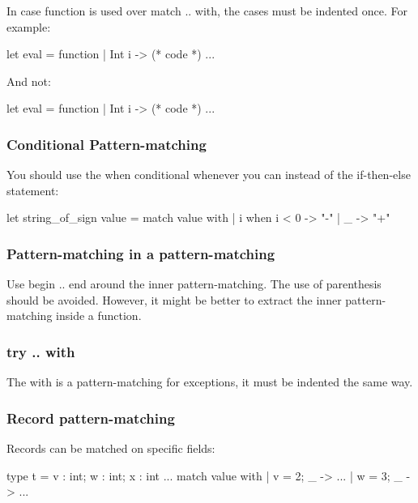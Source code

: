 \documentclass[12pt,a4paper]{article}
\begin{document}
\noindent
In case \textsf{function} is used over \textsf{match .. with}, the cases must be
indented once. For example:

\begin{OCaml}
let eval = function
  | Int i -> (* code *)
...
\end{OCaml}

\noindent
And not:

\begin{OCaml}
let eval = function
           | Int i -> (* code *)
...
\end{OCaml}

\subsubsection*{Conditional Pattern-matching}

You should use the when conditional whenever you can instead of the if-then-else statement:

\begin{OCaml}
let string_of_sign value =
  match value with
  | i when i < 0 -> "-"
  | _ -> "+"
\end{OCaml}

\subsubsection*{Pattern-matching in a pattern-matching}

\medskip

Use \textsf{begin .. end} around the inner pattern-matching. The use of parenthesis should be avoided. However, it might be better to extract the inner pattern-matching inside a function.

\subsubsection*{\textsf{try .. with}}

The with is a pattern-matching for exceptions, it must be indented the same way.

\subsubsection*{Record pattern-matching}

Records can be matched on specific fields:
\begin{OCaml}
type t = { v : int; w : int; x : int }
...
match value with
| { v = 2; _ } -> ... 
| { w = 3; _ } -> ...
\end{OCaml}
\end{document}
